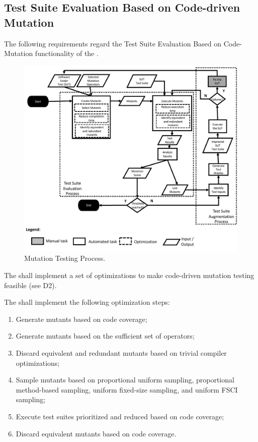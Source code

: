 

\subsection{Test Suite Evaluation Based on Code-driven Mutation}
\label{sec:codeDriven}

The following requirements regard the Test Suite Evaluation Based on Code-Mutation functionality of the \FAQAS.

\begin{figure}
	\centering
		\includegraphics[width=\textwidth]{images/process}
		\caption{Mutation Testing Process.}
		\label{fig:code:process}
	\end{figure}


\RQ{} The \FAQAS shall implement a set of optimizations to make code-driven mutation testing feasible (see D2).

\RQ{} The \FAQAS shall implement the following optimization steps:
\begin{enumerate}
	\item Generate mutants based on code coverage;
	\item Generate mutants based on the sufficient set of operators;
	\item Discard equivalent and redundant mutants based on trivial compiler optimizations;
	\item Sample mutants based on proportional uniform sampling, proportional method-based sampling, uniform fixed-size sampling, and uniform FSCI sampling;
	\item Execute test suites prioritized and reduced based on code coverage;
	\item Discard equivalent mutants based on code coverage.
\end{enumerate}

